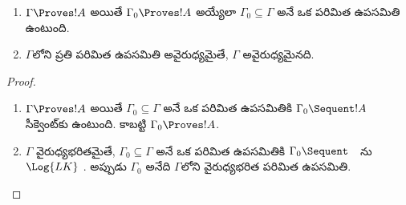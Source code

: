 \documentclass[../../../include/open-logic-section]{subfiles}
\begin{document}
\begin{prop}[సంహతత్వం]
  \begin{enumerate}
  \item $\Gamma \Proves !A$ అయితే $\Gamma_0 \Proves !A$ అయ్యేలా
    $\Gamma_0 \subseteq \Gamma$ అనే ఒక పరిమిత ఉపసమితి ఉంటుంది.
  \item $\Gamma$లోని ప్రతి పరిమిత ఉపసమితి అవైరుధ్యమైతే,
    $\Gamma$ అవైరుధ్యమైనది.
  \end{enumerate}
\end{prop}

\begin{proof}
  \begin{enumerate}
    \item $\Gamma \Proves !A$ అయితే $\Gamma_0 \subseteq \Gamma$ అనే
      ఒక పరిమిత ఉపసమితికి $\Gamma_0 \Sequent !A$ సీక్వెంట్‌కు
       ఉంటుంది. కాబట్టి $\Gamma_0 \Proves !A$.
    \item $\Gamma$ వైరుధ్యభరితమైతే, $\Gamma_0 \subseteq \Gamma$ అనే
      ఒక పరిమిత ఉపసమితికి $\Gamma_0 \Sequent \quad$ను $\Log{LK}$
      . అప్పుడు $\Gamma_0$ అనేది $\Gamma$లోని వైరుధ్యభరిత పరిమిత ఉపసమితి.
  \end{enumerate}
\end{proof}
\end{document}
